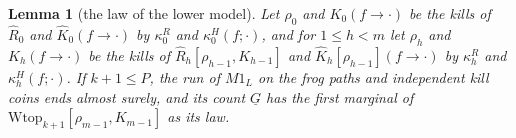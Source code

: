 \documentclass[11pt]{amsart}
\newtheorem{lemma}[theorem]{Lemma}
\theoremstyle{definition}
\numberwithin{equation}{section}
\newcommand{\lean}[1]{\ignorespaces}
\begin{document}
\begin{lemma}[the law of the lower model]\label{lem:m1law}\lean{FrogModel.D3.top_law_gen, FrogModel.D3.law_gen, FrogModel.D3.chain_law, FrogModel.D3.map_fp_read, FrogModel.D3.Gen_Wrec, FrogModel.D3.Gen_Yrec}
Let $\rho_0$ and $K_0(f\to\cdot)$ be the kills of $\widehat R_0$ and $\widehat K_0(f\to\cdot)$ by $\kappa^R_0$ and $\kappa^H_0(f;\cdot)$, and for $1\le h<m$ let $\rho_h$ and $K_h(f\to\cdot)$ be the kills of $\widehat R_h[\rho_{h-1},K_{h-1}]$ and $\widehat K_h[\rho_{h-1}](f\to\cdot)$ by $\kappa^R_h$ and $\kappa^H_h(f;\cdot)$. If $k+1\le P$, the run of $M1_L$ on the frog paths and independent kill coins ends almost surely, and its count $\underline G$ has the first marginal of $\mathrm{Wtop}_{k+1}[\rho_{m-1},K_{m-1}]$ as its law.
\end{lemma}
\end{document}
